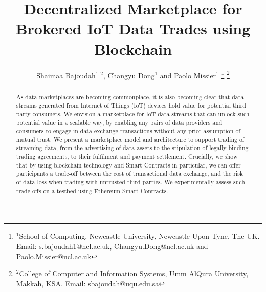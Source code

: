 \documentclass[letterpaper, 10 pt, conference]{ieeeconf}  %
\title{\LARGE \bf
Decentralized Marketplace for Brokered IoT Data Trades using Blockchain
}
\author{Shaimaa Bajoudah$^{1,2}$, Changyu Dong$^{1}$ and Paolo Missier$^{1}$%
\thanks{$^{1}$School of Computing, Newcastle University, Newcastle Upon Tyne, The UK.
         Email: s.bajoudah1@ncl.ac.uk, Changyu.Dong@ncl.ac.uk and Paolo.Missier@ncl.ac.uk}%
\thanks{$^{2}$College of Computer and Information Systems, Umm AlQura University, Makkah, KSA. Email: sbajoudah@uqu.edu.sa}%
}
\begin{document}
\maketitle
\thispagestyle{empty}
\pagestyle{empty}


\begin{abstract}

As data marketplaces are becoming commonplace, it is also becoming clear that data streams generated from Internet of Things (IoT) devices hold value for potential third party consumers.
We envision a marketplace for IoT data streams that can unlock such potential value in a scalable way, by enabling any pairs of data providers and consumers to engage in data exchange transactions without any prior assumption of mutual trust.
We present a marketplace model and architecture to support trading of streaming data, from the advertising of data assets to the stipulation of legally binding trading agreements, to their fulfilment and payment settlement. Crucially, we show that by using blockchain technology and Smart Contracts in particular, we can offer participants a trade-off between the cost of transactional data exchange, and the risk of data loss when trading with untrusted third parties.
We experimentally assess such trade-offs on a testbed using Ethereum Smart Contracts.
%

\end{abstract}
\end{document}
